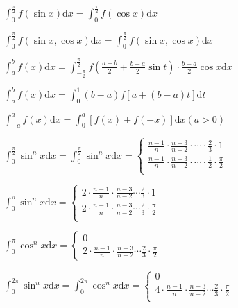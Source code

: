 \begin{spacing}{\hangju}
    \noindent $\displaystyle \int_{0}^{\frac{\pi}{2}}{f(\sin{x})}\mathrm{d}x = \int_{0}^{\frac{\pi}{2}}{f(\cos{x})}\mathrm{d}x $

    \noindent $\displaystyle \int_{0}^{\frac{\pi}{2}}{f(\sin{x}, \cos{x})}\mathrm{d}x = \int_{0}^{\frac{\pi}{2}}{f(\sin{x}, \cos{x})}\mathrm{d}x $

    \noindent $\displaystyle \int_{a}^{b}{f(x)}\mathrm{d}x = \int_{-\frac{\pi}{2}}^{\frac{\pi}{2}}{f(\frac{a + b}{2} + \frac{b - a}{2}\sin{t}) \cdot \frac{b - a}{2}\cos{x}}\mathrm{d}x$

    \noindent $\displaystyle \int_{a}^{b}{f(x)}\mathrm{d}x = \int_{0}^{1}(b - a)f[a + (b - a)t]\mathrm{d}t$

    \noindent $\displaystyle \int_{-a}^{a}{f(x)}\mathrm{d}x = \int_{0}^{a}[f(x) + f(-x)]\mathrm{d}x (a > 0)$

    \noindent $\displaystyle \int_{0}^{\frac{\pi}{2}}{\sin^n{x}}\mathrm{d}x = \int_{0}^{\frac{\pi}{2}}{\sin^n{x}}\mathrm{d}x = \left\{ \begin{array}{l}
        \frac{n - 1}{n} \cdot \frac{n - 3}{n - 2} \cdot \cdots  \cdot \frac{2}{3} \cdot 1 \\
        \frac{n - 1}{n} \cdot \frac{n - 3}{n - 2} \cdot \cdots  \cdot \frac{1}{2} \cdot \frac{\pi}{2} \\
    \end{array}\right.$

    \noindent $\displaystyle \int_{0}^{\pi}{\sin^n{x}}\mathrm{d}x = \left\{ \begin{array}{l}
        2 \cdot \frac{n - 1}{n} \cdot \frac{n - 3}{n - 2} \cdots \frac{2}{3} \cdot 1 \\
        2 \cdot \frac{n - 1}{n} \cdot \frac{n - 3}{n - 2} \cdots \frac{2}{3} \cdot \frac{\pi}{2} \\
    \end{array}\right.$

    \noindent $\displaystyle \int_{0}^{\pi}{\cos^n{x}}\mathrm{d}x = \left\{ \begin{array}{l}
        0 \\
        2 \cdot \frac{n - 1}{n} \cdot \frac{n - 3}{n - 2} \cdots \frac{2}{3} \cdot \frac{\pi}{2}
    \end{array}\right.$

    \noindent $\displaystyle \int_{0}^{2\pi}{\sin^n{x}}\mathrm{d}x = \int_{0}^{2\pi}{\cos^n{x}}\mathrm{d}x =
        \left\{ \begin{array}{l}
        0 \\
        4 \cdot \frac{n - 1}{n} \cdot \frac{n - 3}{n - 2} \cdots \frac{2}{3} \cdot \frac{\pi}{2} \\
    \end{array}\right. $
\end{spacing}
